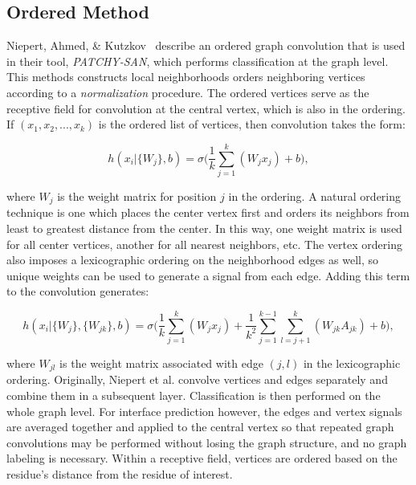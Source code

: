 \subsection{Ordered Method}

Niepert, Ahmed, \& Kutzkov~\cite{niepert2016} describe an ordered graph convolution that is used in their tool, \emph{PATCHY-SAN}, which performs classification at the graph level.
This methods constructs local neighborhoods orders neighboring vertices according to a \emph{normalization} procedure.
The ordered vertices serve as the receptive field for convolution at the central vertex, which is also in the ordering. 
If $(x_1, x_2, ... , x_k)$ is the ordered list of vertices, then convolution takes the form:

\begin{equation}
h(x_i | \{ W_{j} \}, b)= \sigma \bigg( \frac{1}{k} \sum_{j=1}^{k}(W_{j} x_j) + b \bigg),
\label{eq:patchysan}
\end{equation}

\noindent
where $W_j$ is the weight matrix for position $j$ in the ordering.
A natural ordering technique is one which places the center vertex first and orders its neighbors from least to greatest distance from the center. 
In this way, one weight matrix is used for all center vertices, another for all nearest neighbors, etc.
The vertex ordering also imposes a lexicographic ordering on the neighborhood edges as well, so unique weights can be used to generate a signal from each edge. 
Adding this term to the convolution generates:

\begin{equation}
h(x_i | \{ W_{j} \}, \{ W_{jk} \}, b)= \sigma \bigg( \frac{1}{k} \sum_{j=1}^{k}(W_{j} x_j) + \frac{1}{k^2} \sum_{j = 1}^{k-1} \sum_{l=j+1}^{k}(W_{jk} A_{jk})  + b \bigg),
\label{eq:patchysan_2e}
\end{equation}

\noindent
where $W_{jl}$ is the weight matrix associated with edge $(j, l)$ in the lexicographic ordering.
Originally, Niepert et al. convolve vertices and edges separately and combine them in a subsequent layer.
Classification is then performed on the whole graph level.
For interface prediction however, the edges and vertex signals are averaged together and applied to the central vertex so that repeated graph convolutions may be performed without losing the graph structure, and no graph labeling is necessary.
Within a receptive field, vertices are ordered based on the residue's distance from the residue of interest.

